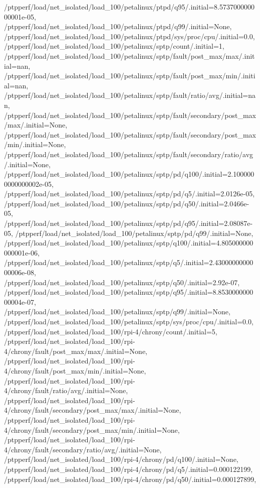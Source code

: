 {    /ptpperf/load/net_isolated/load_100/petalinux/ptpd/q95/.initial=8.573700000000001e-05,
    /ptpperf/load/net_isolated/load_100/petalinux/ptpd/q99/.initial=None,
    /ptpperf/load/net_isolated/load_100/petalinux/ptpd/sys/proc/cpu/.initial=0.0,
    /ptpperf/load/net_isolated/load_100/petalinux/sptp/count/.initial=1,
    /ptpperf/load/net_isolated/load_100/petalinux/sptp/fault/post_max/max/.initial=nan,
    /ptpperf/load/net_isolated/load_100/petalinux/sptp/fault/post_max/min/.initial=nan,
    /ptpperf/load/net_isolated/load_100/petalinux/sptp/fault/ratio/avg/.initial=nan,
    /ptpperf/load/net_isolated/load_100/petalinux/sptp/fault/secondary/post_max/max/.initial=None,
    /ptpperf/load/net_isolated/load_100/petalinux/sptp/fault/secondary/post_max/min/.initial=None,
    /ptpperf/load/net_isolated/load_100/petalinux/sptp/fault/secondary/ratio/avg/.initial=None,
    /ptpperf/load/net_isolated/load_100/petalinux/sptp/pd/q100/.initial=2.1000000000000002e-05,
    /ptpperf/load/net_isolated/load_100/petalinux/sptp/pd/q5/.initial=2.0126e-05,
    /ptpperf/load/net_isolated/load_100/petalinux/sptp/pd/q50/.initial=2.0466e-05,
    /ptpperf/load/net_isolated/load_100/petalinux/sptp/pd/q95/.initial=2.08087e-05,
    /ptpperf/load/net_isolated/load_100/petalinux/sptp/pd/q99/.initial=None,
    /ptpperf/load/net_isolated/load_100/petalinux/sptp/q100/.initial=4.805000000000001e-06,
    /ptpperf/load/net_isolated/load_100/petalinux/sptp/q5/.initial=2.4300000000000006e-08,
    /ptpperf/load/net_isolated/load_100/petalinux/sptp/q50/.initial=2.92e-07,
    /ptpperf/load/net_isolated/load_100/petalinux/sptp/q95/.initial=8.853000000000004e-07,
    /ptpperf/load/net_isolated/load_100/petalinux/sptp/q99/.initial=None,
    /ptpperf/load/net_isolated/load_100/petalinux/sptp/sys/proc/cpu/.initial=0.0,
    /ptpperf/load/net_isolated/load_100/rpi-4/chrony/count/.initial=5,
    /ptpperf/load/net_isolated/load_100/rpi-4/chrony/fault/post_max/max/.initial=None,
    /ptpperf/load/net_isolated/load_100/rpi-4/chrony/fault/post_max/min/.initial=None,
    /ptpperf/load/net_isolated/load_100/rpi-4/chrony/fault/ratio/avg/.initial=None,
    /ptpperf/load/net_isolated/load_100/rpi-4/chrony/fault/secondary/post_max/max/.initial=None,
    /ptpperf/load/net_isolated/load_100/rpi-4/chrony/fault/secondary/post_max/min/.initial=None,
    /ptpperf/load/net_isolated/load_100/rpi-4/chrony/fault/secondary/ratio/avg/.initial=None,
    /ptpperf/load/net_isolated/load_100/rpi-4/chrony/pd/q100/.initial=None,
    /ptpperf/load/net_isolated/load_100/rpi-4/chrony/pd/q5/.initial=0.000122199,
    /ptpperf/load/net_isolated/load_100/rpi-4/chrony/pd/q50/.initial=0.000127899,
}
